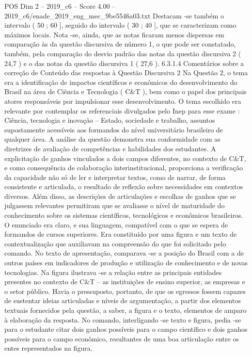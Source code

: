 \begin{textsample}{POS Dim 2 – 2019\_c6 – Score 4.00 – 2019\_c6/enade\_2019\_eng\_mec\_9be5546a03.txt}
Destacam -se também o intervalo ( 50 ; 60 ], seguido do intervalo ( 30 ; 40 ], que se caracterizam como máximos locais.
Nota -se, ainda, que as notas ficaram menos dispersas em comparação às da questão discursiva de número 1, o que pode ser constatado, também, pela comparação do desvio padrão das notas da questão discursiva 2 ( 24,7 ) e o das notas da questão discursiva 1 ( 27,6 ). 6.3.1.4 Comentários sobre a correção de Conteúdo das respostas à Questão Discursiva 2 Na Questão 2, o tema era a identificação de impactos científicos e econômicos do desenvolvimento do Brasil na área de Ciência e Tecnologia ( C\&T ), bem como o papel dos principais atores responsáveis por impulsionar esse desenvolvimento.
O tema escolhido era relevante por contemplar os referenciais divulgados pelo Inep para esse exame : Ciência, tecnologia e inovação – Estado, sociedade e trabalho, assuntos supostamente acessíveis aos formandos do nível universitário brasileiro de qualquer área.
A análise da questão demonstra sua conformidade com as diretrizes de avaliação de competências e habilidades dos estudantes.
A explicitação de ganhos vinculados a dois campos diferentes, no contexto de C\&T, e como consequência de colaboração interinstitucional, proporciona a verificação da capacidade não só de ler e interpretar textos, como de narrar, de forma consistente e articulada, o resultado de reflexão sobre necessidades em contextos diversos.
Além disso, as descrições de articulações e escolhas de ganhos que se julgassem relevantes permitiram que se avaliasse o nível de maturidade do conhecimento sobre os sistemas científicos, tecnológicos e econômicos brasileiros.
O enunciado era claro, e sua linguagem, compatível com o que se espera de formandos de cursos superiores.
Era constituído por uma figura e um texto de contextualização que auxiliavam na compreensão do que foi solicitado pelo comando.
No texto de apresentação, comparava -se a posição do Brasil com a de outros países em indicadores de produção e utilização de conhecimento e de novas tecnologias.
Na figura ilustrava -se a relação entre as principais entidades presentes no contexto de C\&T – as instituições de ensino superior, as empresas e o setor público.
Havia o pressuposto, portanto, de que os egressos fossem capazes de sustentar ideias articuladas e níveis de argumentação, a partir dos elementos textuais fornecidos pela questão, a saber, a figura e o texto, elementos de amparo à elaboração da resposta.
No comando, interligando -se texto e figura, pedia -se para o estudante citar dois ganhos possíveis para o campo científico e dois ganhos possíveis para o campo econômico, resultantes de uma boa articulação entre os entes representados na figura.

\end{textsample}
